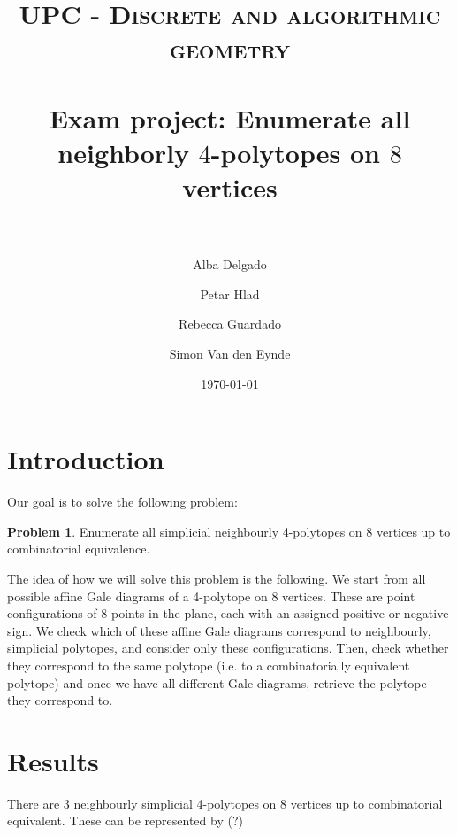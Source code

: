 \documentclass[paper=a4, fontsize=11pt]{scrartcl} %
\title{
\normalfont \normalsize
\textsc{UPC - Discrete and algorithmic geometry} \\ [25pt] %
\horrule{0.5pt} \\[0.4cm] %
\huge Exam project: Enumerate all neighborly $4$-polytopes on $8$ vertices \\ %
\horrule{2pt} \\[0.5cm] %
}
\author{Alba Delgado \and Petar Hlad \and Rebecca Guardado \and Simon Van den Eynde} %
\date{\normalsize\today} %
\theoremstyle{definition}
\newtheorem{prob}{Problem}
\begin{document}
\maketitle %



\section{Introduction}
Our goal is to solve the following problem:
\begin{prob}
Enumerate all simplicial neighbourly 4-polytopes on 8 vertices up to combinatorial equivalence.
\end{prob}
The idea of how we will solve this problem is the following. We start from all possible affine Gale diagrams of a 4-polytope on 8 vertices. These are point configurations of 8 points in the plane, each with an assigned positive or negative sign. We check which of these affine Gale diagrams correspond to neighbourly, simplicial polytopes, and consider only these configurations. Then, check whether they correspond to the same polytope (i.e. to a combinatorially equivalent polytope) and once we have all different Gale diagrams, retrieve the polytope they correspond to.


\section{Results}
There are 3 neighbourly simplicial 4-polytopes on 8 vertices up to combinatorial equivalent. These can be represented by (?)


\end{document}
